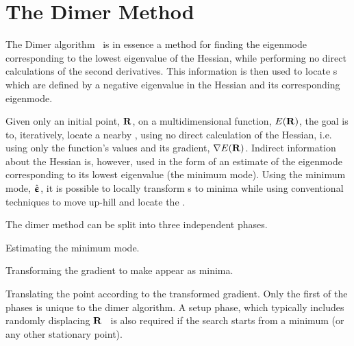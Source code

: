 \section{The Dimer Method}
\label{sec:dimer}


The Dimer algorithm~\cite{dimer-original-1999} is in essence a method for finding the eigenmode corresponding to the lowest eigenvalue of the Hessian, while performing no direct calculations of the second derivatives\cite{hyperdynamics-voter-1997}.
This information is then used to locate s which are defined by a negative eigenvalue in the Hessian and its corresponding eigenmode.

Given only an initial point, ${\mathrm{\mathbf{\bm{R}}}}$, on a multidimensional function, $E({\mathrm{\mathbf{\bm{R}}}})$, the goal is to, iteratively, locate a nearby , using no direct calculation of the Hessian, i.e. using only the function's values and its gradient, $\nabla E({\mathrm{\mathbf{\bm{R}}}})$.
Indirect information about the Hessian is, however, used in the form of an estimate of the eigenmode corresponding to its lowest eigenvalue (the minimum mode).
Using the minimum mode, $\hat{{\mathrm{\mathbf{\bm{\upepsilon}}}}}$, it is possible to locally transform s to minima while using conventional techniques to move up-hill and locate the .

The dimer method can be split into three independent phases.
\item Estimating the minimum mode.
\item Transforming the gradient to make  appear as minima.
\item Translating the point according to the transformed gradient.
\een
Only the first of the phases is unique to the dimer algorithm.
A setup phase, which typically includes randomly displacing ${\mathrm{\mathbf{\bm{R}}}}$~\cite{dimer-sampling-2011} is also required if the search starts from a minimum (or any other stationary point).

